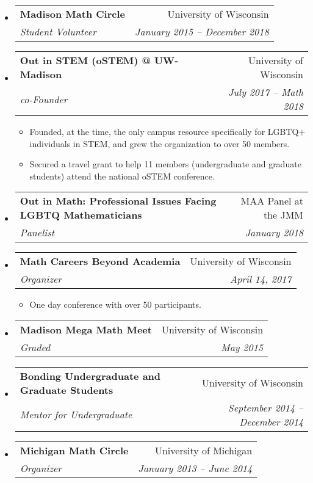 \documentclass[letterpaper,11pt]{article}
\makeatletter
\newcommand{\resitem}[1]{\item #1 \vspace{-2pt}}
\newcommand{\ressubheading}[4]{
\begin{tabular*}{6.5in}[t]{l@{\cftdotfill{\cftsecdotsep}\extracolsep{\fill}}r}
		\textbf{#1} & #2 \\
		\textit{#3} & \textit{#4} \\
\end{tabular*}\vspace{-6pt}}
\makeatother
\begin{document}
\begin{itemize}
\item 
	\ressubheading{Madison Math Circle}{University of Wisconsin}{Student Volunteer}{January 2015 -- December 2018}
	
\item 
	\ressubheading{Out in STEM (oSTEM) @ UW-Madison}{University of Wisconsin}{co-Founder}{July 2017 -- Math 2018}
	\begin{itemize}
		\resitem{Founded, at the time, the only campus resource specifically for LGBTQ+ individuals in STEM, and grew the organization to over 50 members.}
		\resitem{Secured a travel grant to help 11 members (undergraduate and graduate students) attend the national oSTEM conference.}
		\end{itemize}

\item 
	\ressubheading{Out in Math: Professional Issues Facing LGBTQ Mathematicians}{MAA Panel at the JMM}{Panelist}{January 2018}

\item 
\ressubheading{Math Careers Beyond Academia}{University of Wisconsin}{Organizer}{April 14, 2017}
\begin{itemize}
		\resitem{One day conference with over 50 participants.}
		\end{itemize}

\item 
	\ressubheading{Madison Mega Math Meet}{University of Wisconsin}{Graded}{May 2015}
	
\item 
	\ressubheading{Bonding Undergraduate and Graduate Students}{University of Wisconsin}{Mentor for Undergraduate}{September 2014 -- December 2014}

\item 
	\ressubheading{Michigan Math Circle}{University of Michigan}{Organizer}{January 2013 -- June 2014}
	

\end{itemize}
\end{document}
